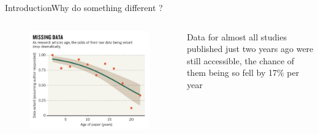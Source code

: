 \documentclass[table]{eecslides}
\begin{document}
\begin{frame}{Introduction}{Why do something different ?}


\begin{columns}[c]
	\begin{column}{.50\paperwidth}
		\begin{figure}
			\includegraphics[width=.50\paperwidth]{Nature_fig.jpg}
		\end{figure}
	\end{column}
	\begin{column}{.4\paperwidth}
		 Data for almost all studies published just two years ago were still accessible, the chance of them being so \alert{fell by 17\% per year} \citep{Vines2013}
	\end{column}
\end{columns}

\end{frame}

\end{document}

